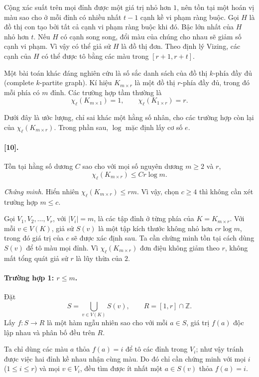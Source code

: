 \documentclass[11pt]{article}
\begin{document}
Cộng xác suất trên mọi đỉnh được một giá trị nhỏ hơn \(1\), nên tồn tại một
hoán vị màu sao cho ở mỗi đỉnh có nhiều nhất \(t-1\) cạnh kề vi phạm ràng
buộc. Gọi \(H\) là đồ thị con tạo bởi tất cả cạnh vi phạm ràng buộc khi đó.
Bậc lớn nhất của \(H\) nhỏ hơn \(t\). Nếu \(H\) có cạnh song song, đổi màu của
chúng cho nhau sẽ giảm số cạnh vi phạm. Vì vậy có thể giả sử \(H\) là đồ thị
đơn. Theo định lý Vizing, các cạnh của \(H\) có thể được tô bằng các màu trong
\([r+1,r+t]\).

Một bài toán khác đáng nghiên cứu là số sắc danh sách của đồ thị \(k\)-phía đầy
đủ (complete \(k\)-partite graph). Kí hiệu \(K_{m\times r}\) là một đồ thị
\(r\)-phía đầy đủ, trong đó mỗi phía có \(m\) đỉnh. Các trường hợp tầm thường
là
\[
  \chi_{\ell}(K_{m\times1})=1,\qquad
  \chi_{\ell}(K_{1\times r})=r.
\]

Dưới đây là ước lượng, chỉ sai khác một hằng số nhân, cho các trường hợp còn
lại của \(\chi_{\ell}(K_{m\times r})\). Trong phần sau, \(\log\) mặc định lấy
cơ số \(e\).

\paragraph{ [10].}
Tồn tại hằng số dương \(C\) sao cho với mọi số nguyên dương \(m\ge2\) và \(r\),
\[
  \chi_{\ell}(K_{m\times r})\le Cr\log m.
\]

\emph{Chứng minh.}
Hiển nhiên \(\chi_{\ell}(K_{m\times r})\le rm\). Vì vậy, chọn \(c\ge4\) thì
không cần xét trường hợp \(m\le c\).

Gọi \(V_1,V_2,\ldots,V_r\), với \(|V_i|=m\), là các tập đỉnh ở từng phía của
\(K=K_{m\times r}\). Với mỗi \(v\in V(K)\), giả sử \(S(v)\) là một tập kích
thước không nhỏ hơn \(cr\log m\), trong đó giá trị của \(c\) sẽ được xác định
sau. Ta cần chứng minh tồn tại cách dùng \(S(v)\) để tô màu mọi đỉnh. Vì
\(\chi_{\ell}(K_{m\times r})\) đơn điệu không giảm theo \(r\), không mất tổng
quát giả sử \(r\) là lũy thừa của \(2\).

\paragraph{Trường hợp 1: \(r\le m\).}
Đặt
\[
  S=\bigcup_{v\in V(K)}S(v),\qquad R=[1,r]\cap\mathbb Z.
\]
Lấy \(f:S\to R\) là một hàm ngẫu nhiên sao cho với mỗi \(a\in S\), giá trị
\(f(a)\) độc lập nhau và phân bố đều trên \(R\).

Ta chỉ dùng các màu \(a\) thỏa \(f(a)=i\) để tô các đỉnh trong \(V_i\); như vậy
tránh được việc hai đỉnh kề nhau nhận cùng màu. Do đó chỉ cần chứng minh với
mọi \(i\) (\(1\le i\le r\)) và mọi \(v\in V_i\), đều tìm được ít nhất một
\(a\in S(v)\) thỏa \(f(a)=i\).
\end{document}
